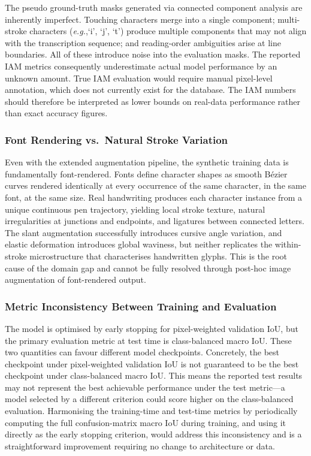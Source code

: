 \documentclass[a4paper,11pt]{article}
\newcommand{\eg}{\emph{e.g.},\xspace}
\begin{document}
The pseudo ground-truth masks generated via connected component analysis are inherently
imperfect. Touching characters merge into a single component; multi-stroke characters
(\eg `i', `j', `t') produce multiple components that may not align with the transcription
sequence; and reading-order ambiguities arise at line boundaries. All of these introduce
noise into the evaluation masks. The reported IAM metrics consequently underestimate
actual model performance by an unknown amount. True IAM evaluation would require manual
pixel-level annotation, which does not currently exist for the database. The IAM numbers
should therefore be interpreted as lower bounds on real-data performance rather than exact
accuracy figures.

\subsubsection{Font Rendering vs.\ Natural Stroke Variation}

Even with the extended augmentation pipeline, the synthetic training data is fundamentally
font-rendered. Fonts define character shapes as smooth B\'{e}zier curves rendered
identically at every occurrence of the same character, in the same font, at the same size.
Real handwriting produces each character instance from a unique continuous pen trajectory,
yielding local stroke texture, natural irregularities at junctions and endpoints, and
ligatures between connected letters. The slant augmentation successfully introduces
cursive angle variation, and elastic deformation introduces global waviness, but neither
replicates the within-stroke microstructure that characterises handwritten glyphs. This is
the root cause of the domain gap and cannot be fully resolved through post-hoc image
augmentation of font-rendered output.

\subsubsection{Metric Inconsistency Between Training and Evaluation}
\label{sec:metric_inconsistency}

The model is optimised by early stopping for pixel-weighted validation IoU, but the
primary evaluation metric at test time is class-balanced macro IoU. These two quantities
can favour different model checkpoints. Concretely, the best checkpoint under
pixel-weighted validation IoU is not guaranteed to be the best checkpoint under
class-balanced macro IoU. This means the reported test results may not represent the best
achievable performance under the test metric---a model selected by a different criterion
could score higher on the class-balanced evaluation. Harmonising the training-time and
test-time metrics by periodically computing the full confusion-matrix macro IoU during
training, and using it directly as the early stopping criterion, would address this
inconsistency and is a straightforward improvement requiring no change to architecture or
data.
\end{document}
